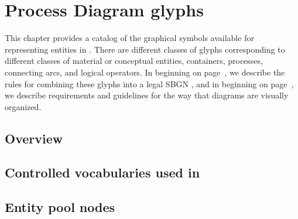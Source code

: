 
\chapter{Process Diagram glyphs}


This chapter provides a catalog of the graphical symbols available for representing entities in \PDs.  There are different classes of glyphs corresponding to different classes of material or conceptual entities, containers, processes, connecting arcs, and logical operators.  In  beginning on page~\pageref{chp:grammar}, we describe the rules for combining these glyphs into a legal SBGN \PD, and in  beginning on page~\pageref{chp:layout}, we describe requirements and guidelines for the way that diagrams are visually organized.

\section{Overview}



\section{Controlled vocabularies used in \SBGNPDLone}\label{sec:CVs}




\section{Entity pool nodes}\label{sec:EPNs}

